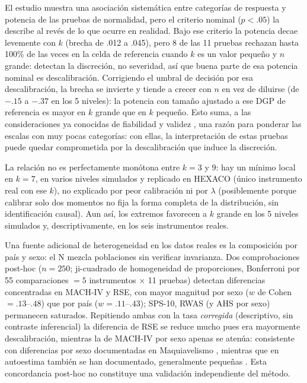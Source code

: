 \documentclass[man,mask,donotrepeattitle,floatsintext]{apa7}
\begin{document}
El estudio muestra una asociación sistemática entre categorías de respuesta y potencia de las pruebas de normalidad, pero el criterio nominal ($p<.05$) la describe al revés de lo que ocurre en realidad. Bajo ese criterio la potencia decae levemente con $k$ (brecha de .012 a .045), pero 8 de las 11 pruebas rechazan hasta 100\% de las veces en la celda de referencia cuando $k$ es un valor pequeño y $n$ grande: detectan la discreción, no severidad, así que buena parte de esa potencia nominal es descalibración. Corrigiendo el umbral de decisión por esa descalibración, la brecha se invierte y tiende a crecer con $n$ en vez de diluirse (de $-.15$ a $-.37$ en los 5 niveles): la potencia con tamaño ajustado a ese DGP de referencia es mayor en $k$ grande que en $k$ pequeño. Esto suma, a las consideraciones ya conocidas de fiabilidad y validez \parencite{lozano2008,preston2000}, una razón para ponderar las escalas con muy pocas categorías: con ellas, la interpretación de estas pruebas puede quedar comprometida por la descalibración que induce la discreción.

La relación no es perfectamente monótona entre $k=3$ y $9$: hay un mínimo local en $k=7$, en varios niveles simulados y replicado en HEXACO (único instrumento real con ese $k$), no explicado por peor calibración ni por $\lambda$ (posiblemente porque calibrar solo dos momentos no fija la forma completa de la distribución, sin identificación causal). Aun así, los extremos favorecen a $k$ grande en los 5 niveles simulados y, descriptivamente, en los seis instrumentos reales.

Una fuente adicional de heterogeneidad en los datos reales es la composición por país y sexo: el N mezcla poblaciones sin verificar invarianza. Dos comprobaciones post-hoc ($n=250$; ji-cuadrado de homogeneidad de proporciones, Bonferroni por 55 comparaciones $=5$ instrumentos $\times$ 11 pruebas) detectan diferencias concentradas en MACH-IV y RSE, con mayor magnitud por sexo ($w$ de Cohen $=.13$–$.48$) que por país ($w=.11$–$.43$); SPS-10, RWAS (y AHS por sexo) permanecen saturados. Repitiendo ambas con la tasa \emph{corregida} (descriptivo, sin contraste inferencial) la diferencia de RSE se reduce mucho pues era mayormente descalibración, mientras la de MACH-IV por sexo apenas se atenúa: consistente con diferencias por sexo documentadas en Maquiavelismo \parencite{muris2017,confino2024}, mientras que en autoestima también se han documentado, generalmente pequeñas \parencite{kling1999}. Esta concordancia post-hoc no constituye una validación independiente del método.
\end{document}
